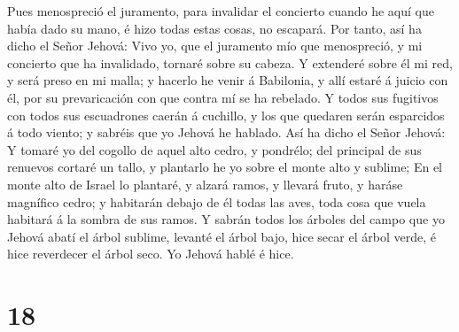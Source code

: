  Pues menospreció el juramento, para invalidar el concierto
cuando he aquí que había dado su mano, é hizo todas estas cosas, no
escapará.  Por tanto, así ha dicho el Señor Jehová: Vivo
yo, que el juramento mío que menospreció, y mi concierto que ha
invalidado, tornaré sobre su cabeza.  Y extenderé sobre él
mi red, y será preso en mi malla; y hacerlo he venir á Babilonia, y allí
estaré á juicio con él, por su prevaricación con que contra mí se ha
rebelado.  Y todos sus fugitivos con todos sus escuadrones
caerán á cuchillo, y los que quedaren serán esparcidos á todo viento; y
sabréis que yo Jehová he hablado.  Así ha dicho el Señor
Jehová: Y tomaré yo del cogollo de aquel alto cedro, y pondrélo; del
principal de sus renuevos cortaré un tallo, y plantarlo he yo sobre el
monte alto y sublime;  En el monte alto de Israel lo
plantaré, y alzará ramos, y llevará fruto, y haráse magnífico cedro; y
habitarán debajo de él todas las aves, toda cosa que vuela habitará á la
sombra de sus ramos.  Y sabrán todos los árboles del campo
que yo Jehová abatí el árbol sublime, levanté el árbol bajo, hice secar
el árbol verde, é hice reverdecer el árbol seco. Yo Jehová hablé é hice.

\hypertarget{section-17}{%
\section{18}\label{section-17}}

